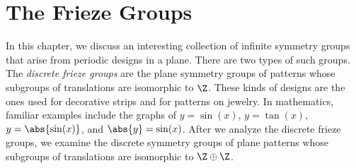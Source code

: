 \section{The Frieze Groups}

\begin{remark}
	In this chapter, we discuss an interesting collection of infinite symmetry groups that arise from periodic designs in a plane. There are two types of such groups. The \textit{discrete frieze groups} are the plane symmetry groups of patterns whose subgroups of translations are isomorphic to $\Z$. These kinds of designs are the ones used for decorative strips and for patterns on jewelry. In mathematics, familiar examples include the graphs of $y=\sin(x)$, $y=\tan(x)$, $y=\abs{\sin(x)}$, and $\abs{y} = \sin(x)$. After we analyze the discrete frieze groups, we examine the discrete symmetry groups of plane patterns whose subgroups of translations are isomorphic to $\Z \oplus \Z$.
\end{remark}
